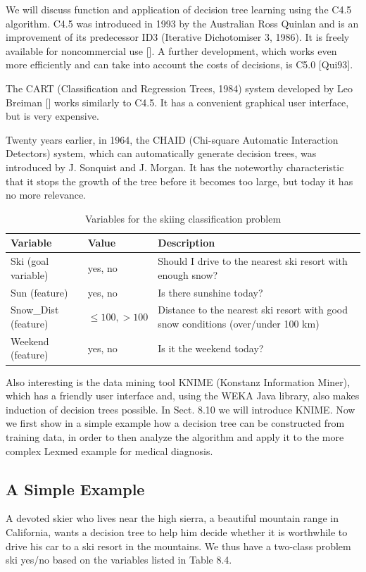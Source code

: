 \documentclass[10pt]{book}
\begin{document}
We will discuss function and application of decision tree learning using the C4.5 algorithm. C4.5 was introduced in 1993 by the Australian Ross Quinlan and is an improvement of its predecessor ID3 (Iterative Dichotomiser 3, 1986). It is freely available for noncommercial use [\cite{quinlan1993c45}]. A further development, which works even more efficiently and can take into account the costs of decisions, is C5.0 [Qui93].

The CART (Classification and Regression Trees, 1984) system developed by Leo Breiman [\cite{breiman1984cart}] works similarly to C4.5. It has a convenient graphical user interface, but is very expensive.

Twenty years earlier, in 1964, the CHAID (Chi-square Automatic Interaction Detectors) system, which can automatically generate decision trees, was introduced by J. Sonquist and J. Morgan. It has the noteworthy characteristic that it stops the growth of the tree before it becomes too large, but today it has no more relevance.

\begin{table}[htbp]
\centering
\caption{Variables for the skiing classification problem}
\begin{tabular}{|l|l|l|}
\hline
Variable & Value & Description \\
\hline
Ski (goal variable) & yes, no & Should I drive to the nearest ski resort with enough snow? \\
\hline
Sun (feature) & yes, no & Is there sunshine today? \\
\hline
Snow\_Dist (feature) & $\leq 100,>100$ & Distance to the nearest ski resort with good snow conditions (over/under 100 km) \\
\hline
Weekend (feature) & yes, no & Is it the weekend today? \\
\hline
\end{tabular}
\end{table}

Also interesting is the data mining tool KNIME (Konstanz Information Miner), which has a friendly user interface and, using the WEKA Java library, also makes induction of decision trees possible. In Sect. 8.10 we will introduce KNIME.
Now we first show in a simple example how a decision tree can be constructed from training data, in order to then analyze the algorithm and apply it to the more complex Lexmed example for medical diagnosis.

\subsection{A Simple Example}
A devoted skier who lives near the high sierra, a beautiful mountain range in California, wants a decision tree to help him decide whether it is worthwhile to drive his car to a ski resort in the mountains. We thus have a two-class problem ski yes/no based on the variables listed in Table 8.4.
\end{document}
